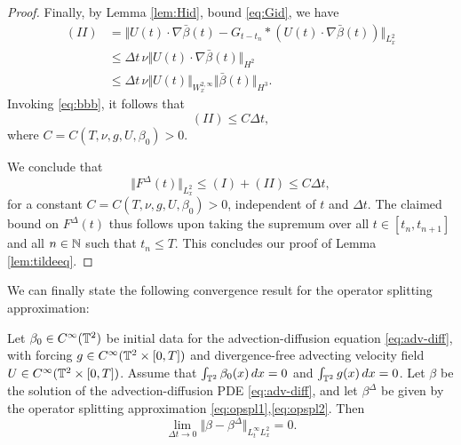\documentclass[reqno,12pt]{amsart}
\begin{document}
\begin{proof}
Finally, by Lemma \ref{lem:Hid}, bound \eqref{eq:Gid}, we have
\begin{align*}
(II)
&=
\Vert
U(t) \cdot \nabla \bar{\beta}(t)
-G_{t-t_n} \ast \left( U(t) \cdot \nabla \bar{\beta}(t) \right)
\Vert_{L^2_x}
\\
&\le \Delta t \, \nu \Vert U(t) \cdot \nabla \bar{\beta}(t) \Vert_{H^2}
\\
&\le \Delta t \, \nu \Vert U(t) \Vert_{W^{2,\infty}_x} \Vert \bar{\beta}(t) \Vert_{H^3}.
\end{align*}
Invoking \eqref{eq:bbb}, it follows that
\[
(II) \le C \Delta t,
\]
where $C = C(T,\nu, g,U,\beta_0)>0$.

We conclude that
\[
\Vert F^\Delta(t) \Vert_{L^2_x}
\le (I) + (II) \le C\Delta t,
\]
for a constant $C = C(T,\nu, g,U,\beta_0)>0$, independent of $t$ and $\Delta t$. The claimed bound on $F^\Delta(t)$ thus follows upon taking the supremum over all $t \in [t_n,t_{n+1}]$ and all $n\in \mathbb{N}$ such that $t_n \le T$. This concludes our proof of Lemma \ref{lem:tildeeq}.
\end{proof}

We can finally state the following convergence result for the operator splitting approximation:

\begin{proposition}
\label{prop:splitconv}
Let $\beta_0 \in C^\infty(\mathbb{T}^2)$ be initial data for the advection-diffusion equation \eqref{eq:adv-diff}, with forcing $g \in C^\infty(\mathbb{T}^2\times [0,T])$ and divergence-free advecting velocity field $U\in C^\infty(\mathbb{T}^2\times [0,T])$. Assume that $\int_{\mathbb{T}^2} \beta_0(x) \, dx = 0$ and $\int_{\mathbb{T}^2} g(x) \, dx = 0$. Let $\beta$ be the solution of the advection-diffusion PDE \eqref{eq:adv-diff}, and let ${\beta}^\Delta$ be given by the operator splitting approximation \eqref{eq:opspl1},\eqref{eq:opspl2}. Then
\[
\lim_{\Delta t\to 0} \Vert \beta - {\beta}^\Delta \Vert_{L^\infty_t L^2_x} = 0.
\]
\end{proposition}
\end{document}
